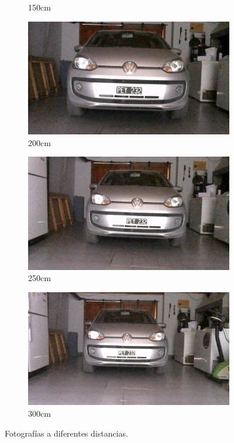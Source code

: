\begin{figure}
\begin{subfigure}{.3\textwidth}
        \caption{150cm}
    \end{subfigure}
    \begin{subfigure}{.3\textwidth}
        \centering
        \includegraphics[width=\textwidth]{imgs/test-distancia/0_200.jpg}
        \caption{200cm}
    \end{subfigure}
    \begin{subfigure}{.3\textwidth}
        \centering
        \includegraphics[width=\textwidth]{imgs/test-distancia/0_250.jpg}
        \caption{250cm}
    \end{subfigure}
    \begin{subfigure}{.3\textwidth}
        \centering
        \includegraphics[width=\textwidth]{imgs/test-distancia/0_300.jpg}
        \caption{300cm}
    \end{subfigure}
    \caption{Fotografías a diferentes distancias.}
    \label{fig:fotos-distancia}
\end{figure}

